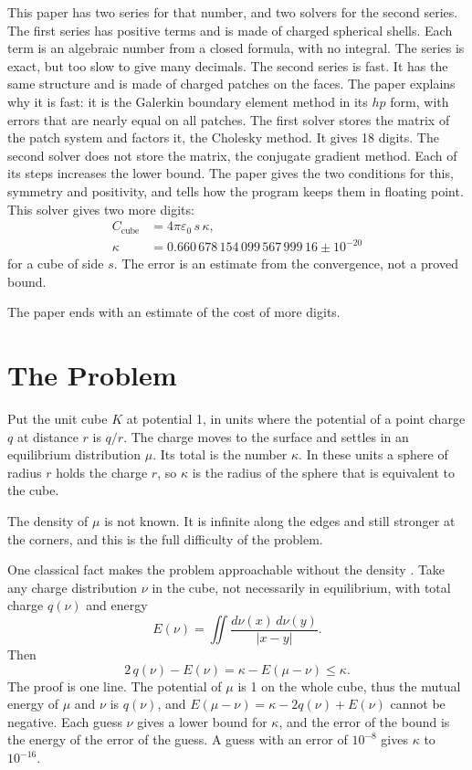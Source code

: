 \documentclass[journal]{IEEEtran}
\begin{document}
This paper has two series for that number, and two solvers for the second series. The first series has positive terms and is made of charged spherical shells. Each term is an algebraic number from a closed formula, with no integral. The series is exact, but too slow to give many decimals. The second series is fast. It has the same structure and is made of charged patches on the faces. The paper explains why it is fast: it is the Galerkin boundary element method in its $hp$ form, with errors that are nearly equal on all patches. The first solver stores the matrix of the patch system and factors it, the Cholesky method. It gives 18 digits. The second solver does not store the matrix, the conjugate gradient method. Each of its steps increases the lower bound. The paper gives the two conditions for this, symmetry and positivity, and tells how the program keeps them in floating point. This solver gives two more digits:
\begin{align}
C_{\text{cube}} &= 4\pi\varepsilon_0\, s\,\kappa, \nonumber\\
\kappa &= 0.660\,678\,154\,099\,567\,999\,16 \pm 10^{-20}
\label{eq:result}
\end{align}
for a cube of side $s$. The error is an estimate from the convergence, not a proved bound.

The paper ends with an estimate of the cost of more digits.

\section{The Problem}
Put the unit cube $K$ at potential 1, in units where the potential of a point charge $q$ at distance $r$ is $q/r$. The charge moves to the surface and settles in an equilibrium distribution $\mu$. Its total is the number $\kappa$. In these units a sphere of radius $r$ holds the charge $r$, so $\kappa$ is the radius of the sphere that is equivalent to the cube.

The density of $\mu$ is not known. It is infinite along the edges and still stronger at the corners, and this is the full difficulty of the problem.

One classical fact makes the problem approachable without the density \cite{polya}. Take any charge distribution $\nu$ in the cube, not necessarily in equilibrium, with total charge $q(\nu)$ and energy
\begin{equation}
E(\nu) = \iint \frac{d\nu(x)\, d\nu(y)}{|x-y|}.
\end{equation}
Then
\begin{equation}
2\,q(\nu) - E(\nu) = \kappa - E(\mu - \nu) \le \kappa .
\label{eq:principle}
\end{equation}
The proof is one line. The potential of $\mu$ is 1 on the whole cube, thus the mutual energy of $\mu$ and $\nu$ is $q(\nu)$, and $E(\mu-\nu) = \kappa - 2q(\nu) + E(\nu)$ cannot be negative. Each guess $\nu$ gives a lower bound for $\kappa$, and the error of the bound is the energy of the error of the guess. A guess with an error of $10^{-8}$ gives $\kappa$ to $10^{-16}$.
\end{document}
